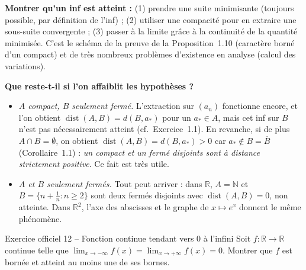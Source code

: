 \documentclass[11pt,a4paper]{article}
\newcommand{\R}{\mathbb{R}}
\newcommand{\N}{\mathbb{N}}
\newcommand{\adh}[1]{\overline{#1}}
\newcommand{\dist}{\operatorname{dist}}
\theoremstyle{definition}
\begin{document}
\begin{methode}
\textbf{Montrer qu'un inf est atteint :} (1) prendre une suite minimisante (toujours possible, par définition de l'inf) ; (2) utiliser une compacité pour en extraire une sous-suite convergente ; (3) passer à la limite grâce à la continuité de la quantité minimisée. C'est le schéma de la preuve de la Proposition~1.10 (caractère borné d'un compact) et de très nombreux problèmes d'existence en analyse (calcul des variations).
\end{methode}

\begin{commentaire}
\textbf{Que reste-t-il si l'on affaiblit les hypothèses ?}
\begin{itemize}
  \item \emph{$A$ compact, $B$ seulement fermé.} L'extraction sur $(a_n)$ fonctionne encore, et l'on obtient $\dist(A,B)=d(B,a_*)$ pour un $a_*\in A$, mais cet inf sur $B$ n'est pas nécessairement atteint (cf.\ Exercice~1.1). En revanche, si de plus $A\cap B=\emptyset$, on obtient $\dist(A,B)=d(B,a_*)>0$ car $a_*\notin B=\adh B$ (Corollaire~1.1) : \emph{un compact et un fermé disjoints sont à distance strictement positive}. Ce fait est très utile.
  \item \emph{$A$ et $B$ seulement fermés.} Tout peut arriver : dans $\R$, $A=\N$ et $B=\{n+\tfrac1n : n\ge2\}$ sont deux fermés disjoints avec $\dist(A,B)=0$, non atteinte. Dans $\R^2$, l'axe des abscisses et le graphe de $x\mapsto e^x$ donnent le même phénomène.
\end{itemize}
\end{commentaire}

\begin{exo}{Exercice officiel 12 -- Fonction continue tendant vers $0$ à l'infini}
Soit $f:\R\to\R$ continue telle que $\lim_{x\to-\infty}f(x)=\lim_{x\to+\infty}f(x)=0$. Montrer que $f$ est bornée et atteint au moins une de ses bornes.
\end{exo}
\end{document}
